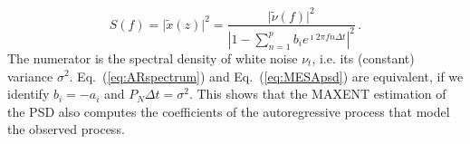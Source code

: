 \documentclass[twocolumn,showpacs,preprintnumbers,nofootinbib,prd,
superscriptaddress,10pt]{revtex4-1}
\newcommand{\sschmidt}[1]{{\textcolor{red}{\texttt{SS: #1}} }}
\begin{document}
\begin{equation}\label{eq:ARspectrum}
    S(f) = \vert \tilde x(z)\vert ^ 2 = 
    \frac{\vert \tilde \nu(f) \vert ^ 2}{\left\vert 1 - \sum_{n = 1}^p b_i e^{\imath 2 \pi f n \Delta t} \right\vert ^ 2}\,.
\end{equation}
The numerator is the spectral density of white noise $\nu_t$, i.e. its (constant) variance $\sigma^2$.
Eq.~(\ref{eq:ARspectrum}) and Eq.~(\ref{eq:MESApsd}) are equivalent, if we identify $b_i = - a_i$ and $P_N \Delta t= \sigma ^ 2$.
This shows that the MAXENT estimation of the PSD also computes the coefficients of the autoregressive 
process that model the observed process.

\end{document}
